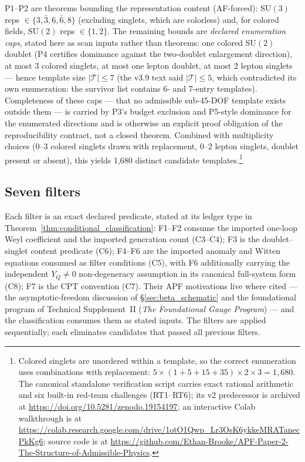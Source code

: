 \documentclass[11pt]{article}
\theoremstyle{definition}
\newcommand{\SU}{\mathrm{SU}}
\newcommand{\TSII}{Technical Supplement~II (\emph{The Foundational Gauge Program})}
\begin{document}
\noindent P1--P2 are theorems bounding the representation content
(AF-forced): $\SU(3)$ reps $\in \{3, \bar{3}, 6, \bar{6}, 8\}$
(excluding singlets, which are colorless) and, for colored fields,
$\SU(2)$ reps $\in \{1, 2\}$.  The remaining bounds are \emph{declared
enumeration caps}, stated here as scan inputs rather than theorems:
one colored $\SU(2)$ doublet (P4 certifies dominance against the
two-doublet enlargement direction), at most 3 colored singlets, at most one lepton
doublet, at most 2 lepton singlets --- hence template size
$|\mathcal{T}| \le 7$ (the v3.9 text said $|\mathcal{T}| \le 5$, which
contradicted its own enumeration: the survivor list contains 6- and
7-entry templates).  Completeness of these caps --- that no admissible
sub-45-DOF template exists outside them --- is carried by P3's budget exclusion and P5-style
dominance for the enumerated directions and is otherwise an explicit
proof obligation of the reproducibility contract, not a closed
theorem.
Combined with multiplicity choices (0--3 colored singlets drawn
with replacement, 0--2 lepton singlets, doublet present or absent),
this yields 1{,}680 distinct candidate templates.\footnote{Colored
singlets are unordered within a template, so the correct enumeration
uses combinations with replacement: $5 \times (1 + 5 + 15 + 35)
\times 2 \times 3 = 1{,}680$.  The canonical standalone verification script carries exact rational
arithmetic and six built-in red-team challenges (RT1--RT6); its v2
predecessor is archived at \url{https://doi.org/10.5281/zenodo.19154197}; an
interactive Colab walkthrough is at
\url{https://colab.research.google.com/drive/1otO1Qwp_Lr3OsK6ykkeMRATanecPkKg6};
source code is at
\url{https://github.com/Ethan-Brooke/APF-Paper-2-The-Structure-of-Admissible-Physics}.}


\subsection{Seven filters}
\label{sec:seven_filters}

Each filter is an exact declared predicate, stated at its ledger type
in Theorem~\ref{thm:conditional_classification}: F1--F2 consume the
imported one-loop Weyl coefficient and the imported generation count
(C3--C4); F3 is the doublet--singlet content predicate (C6); F4--F6 are the imported
anomaly and Witten equations consumed as filter conditions (C5), with
F6 additionally carrying the independent $Y_Q \neq 0$ non-degeneracy
assumption in its canonical full-system form (C8); F7 is the CPT
convention (C7).  Their APF motivations live where cited --- the
asymptotic-freedom discussion of \S\ref{sec:beta_schematic} and the
foundational program of \TSII{} --- and the classification consumes
them as stated inputs.  The filters are applied sequentially; each
eliminates candidates that passed all previous filters.
\end{document}
